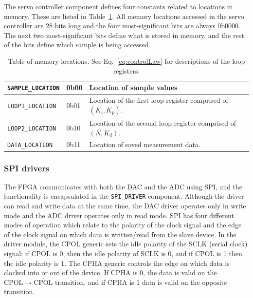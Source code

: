 \documentclass{article}
\begin{document}
The servo controller component defines four constants related to locations in memory.  These are listed in Table~\ref{tb:memoryLocations}.  All memory locations accessed in the servo controller are 28 bits long and the four most-significant bits are always 0b0000.  The next two most-significant bits define what is stored in memory, and the rest of the bits define which sample is being accessed.
\begin{table}[htbp]
	\centering
	\begin{tabular}{|l|l|l|}
		\hline
		\verb+SAMPLE_LOCATION+ & 0b00 & Location of sample values\\\hline
		\verb+LOOP1_LOCATION+ & 0b01 & Location of the first loop register comprised of $(K_i,K_p)$.\\\hline
		\verb+LOOP2_LOCATION+ & 0b10 & Location of the second loop register comprised of $(N,K_d)$.\\\hline
		\verb+DATA_LOCATION+ & 0b11 & Location of saved measurement data.\\\hline
	\end{tabular}
	\caption{Table of memory locations.  See Eq.~\eqref{eq:controlLaw} for descriptions of the loop registers.}
	\label{tb:memoryLocations}
\end{table}

\subsubsection{SPI drivers}
\label{sssec:SPI}
The FPGA communicates with both the DAC and the ADC using SPI, and the functionality is encapsulated in the \verb+SPI_DRIVER+ component.  Although the driver can read and write data at the same time, the DAC driver operates only in write mode and the ADC driver operates only in read mode.  SPI has four different modes of operation which relate to the polarity of the clock signal and the edge of the clock signal on which data is written/read from the slave device.  In the driver module, the CPOL generic sets the idle polarity of the SCLK (serial clock) signal: if CPOL is 0, then the idle polarity of SCLK is 0, and if CPOL is 1 then the idle polarity is 1.  The CPHA generic controls the edge on which data is clocked into or out of the device.  If CPHA is 0, the data is valid on the $\text{CPOL}\rightarrow\overline{\text{CPOL}}$ transition, and if CPHA is 1 data is valid on the opposite transition.
\end{document}
